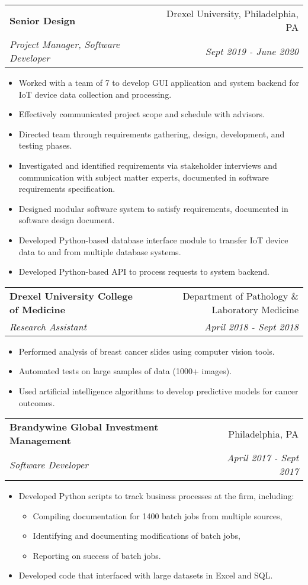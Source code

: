 \documentclass[letterpaper,11pt]{article}
\makeatletter
\newcommand{\resumeSubheading}[4]{
	\vspace{-1pt}\item
		\begin{tabular*}{0.97\textwidth}[t]{l@{\extracolsep{\fill}}r}
			\textbf{#1} & #2 \\
			\textit{\small#3} & \textit{\small #4} \\
		\end{tabular*}\vspace{-5pt}
}
\makeatother
\begin{document}
		\resumeSubheading
			{Senior Design}{Drexel University, Philadelphia, PA}
			{Project Manager, Software Developer}{Sept 2019 - June 2020}
		\begin{itemize}
			\item\small{Worked with a team of 7 to develop GUI application and system backend for IoT device data collection and processing.}
			\item\small{Effectively communicated project scope and schedule with advisors.}
			\item\small{Directed team through requirements gathering, design, development, and testing phases.}
			\item\small{Investigated and identified requirements via stakeholder interviews and communication with subject matter experts, documented in software requirements specification.}
			\item\small{Designed modular software system to satisfy requirements, documented in software design document.}
			\item\small{Developed Python-based database interface module to transfer IoT device data to and from multiple database systems.}
			\item\small{Developed Python-based API to process requests to system backend.}
		\end{itemize}

		\resumeSubheading
			{Drexel University College of Medicine}{Department of Pathology \& Laboratory Medicine}
			{Research Assistant}{April 2018 - Sept 2018}
		\begin{itemize}
			\item\small{Performed analysis of breast cancer slides using computer vision tools.}
			\item\small{Automated tests on large samples of data (1000+ images).}
			\item\small{Used artificial intelligence algorithms to develop predictive models for cancer outcomes.}
		\end{itemize}

		\resumeSubheading
			{Brandywine Global Investment Management}{Philadelphia, PA}
			{Software Developer}{April 2017 - Sept 2017}
		\begin{itemize}
			\item\small{Developed Python scripts to track business processes at the firm, including:}
			\begin{itemize}
				\item\small{Compiling documentation for 1400 batch jobs from multiple sources,}
				\item\small{Identifying and documenting modifications of batch jobs,}
				\item\small{Reporting on success of batch jobs.}
			\end{itemize}
			\item\small{Developed code that interfaced with large datasets in Excel and SQL.}
		\end{itemize}
\end{document}
